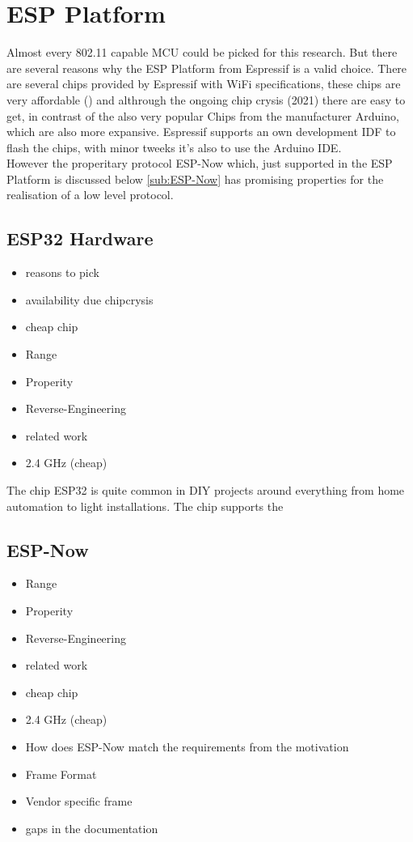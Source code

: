 \documentclass[]{ccs-thesis}
\begin{document}
\section{ESP Platform}
Almost every 802.11 capable \ac{MCU} could be picked for this research.
But there are several reasons why the ESP Platform from Espressif is a valid choice.
There are several chips provided by Espressif with WiFi specifications, these chips are very affordable () 
and althrough the ongoing chip crysis (2021) there are easy to get, in contrast of the also very popular Chips from the manufacturer Arduino, which are also more expansive.
Espressif supports an own development IDF to flash the chips, with minor tweeks it's also to use the Arduino IDE.\\
However the properitary protocol ESP-Now which, just supported in the ESP Platform is discussed below \cref{sub:ESP-Now} has promising properties for the realisation of a low level protocol.

\subsection*{ESP32 Hardware}
\begin{itemize}
\item reasons to pick
\item availability due chipcrysis
\item cheap chip
\item Range
\item Properity
\item Reverse-Engineering 
\item related work
\item 2.4 GHz (cheap)
\end{itemize}
The chip ESP32 is quite common in DIY projects around everything from home automation to light installations. The chip supports the 

\subsection*{ESP-Now}
\label{sub:ESP-Now}
\begin{itemize}
\item Range
\item Properity
\item Reverse-Engineering 
\item related work
\item cheap chip
\item 2.4 GHz (cheap)
\item How does ESP-Now match the requirements from the motivation
\item Frame Format
\item Vendor specific frame
\item gaps in the documentation
\end{itemize}
\end{document}
